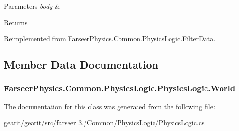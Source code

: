 \begin{DoxyParams}{Parameters}
{\em body} & \\
\hline
\end{DoxyParams}
\begin{DoxyReturn}{Returns}

\end{DoxyReturn}


Reimplemented from \hyperlink{class_farseer_physics_1_1_common_1_1_physics_logic_1_1_filter_data_a1513f817fadd766ee29203130ec909a2}{Farseer\+Physics.\+Common.\+Physics\+Logic.\+Filter\+Data}.



\subsection{Member Data Documentation}
\hypertarget{class_farseer_physics_1_1_common_1_1_physics_logic_1_1_physics_logic_a9956c78b10bc30276793f19f0e181c2a}{
\subsubsection[{World}]{ Farseer\+Physics.\+Common.\+Physics\+Logic.\+Physics\+Logic.\+World}}\label{class_farseer_physics_1_1_common_1_1_physics_logic_1_1_physics_logic_a9956c78b10bc30276793f19f0e181c2a}


The documentation for this class was generated from the following file\+:\begin{DoxyCompactItemize}
\item 
gearit/gearit/src/farseer 3./\+Common/\+Physics\+Logic/\hyperlink{_physics_logic_8cs}{Physics\+Logic.\+cs}\end{DoxyCompactItemize}
